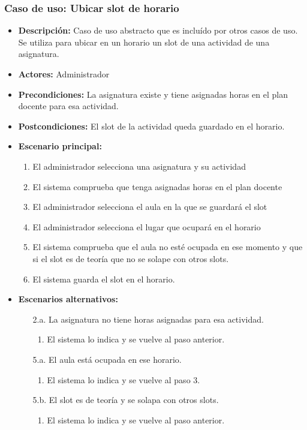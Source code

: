 \subsubsection*{Caso de uso: Ubicar slot de horario}
\label{guardar_slot}
\begin{itemize}
\item{\bf Descripción:} Caso de uso abstracto que es incluído por otros casos de uso. Se utiliza para ubicar en un horario un slot de una actividad de una asignatura.
\item{\bf Actores:} Administrador
\item{\bf Precondiciones:} La asignatura existe y tiene asignadas horas en el plan docente para esa actividad.
\item{\bf Postcondiciones:} El slot de la actividad queda guardado en el horario.
\item{\bf Escenario principal:}
	\begin{enumerate}
	\item El administrador selecciona una asignatura y su actividad
	\item El sistema comprueba que tenga asignadas horas en el plan docente
	\item El administrador selecciona el aula en la que se guardará el slot
	\item El administrador selecciona el lugar que ocupará en el horario
	\item El sistema comprueba que el aula no esté ocupada en ese momento y que si el slot es de teoría que no se solape con otros slots.
	\item El sistema guarda el slot en el horario.
	\end{enumerate}
\item{\bf Escenarios alternativos:}
	\begin{itemize}
		\item[2.a.] La asignatura no tiene horas asignadas para esa actividad.
		\begin{enumerate}
			\item El sistema lo indica y se vuelve al paso anterior.
		\end{enumerate}
		\item[5.a.] El aula está ocupada en ese horario.
		\begin{enumerate}
			\item El sistema lo indica y se vuelve al paso 3.
		\end{enumerate}
		\item[5.b.] El slot es de teoría y se solapa con otros slots.
		\begin{enumerate}
			\item El sistema lo indica y se vuelve al paso anterior.
		\end{enumerate}
	\end{itemize}
\end{itemize}




